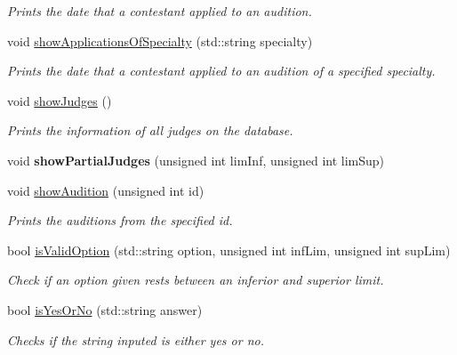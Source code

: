 \begin{DoxyCompactItemize}
\begin{DoxyCompactList}\small\item\em Prints the date that a contestant applied to an audition. \end{DoxyCompactList}\item 
\mbox{\label{class_company_m_s_a8a1ecf86813a5267a3b362c42eda0277}} 
void \hyperlink{class_company_m_s_a8a1ecf86813a5267a3b362c42eda0277}{show\+Applications\+Of\+Specialty} (std\+::string specialty)
\begin{DoxyCompactList}\small\item\em Prints the date that a contestant applied to an audition of a specified specialty. \end{DoxyCompactList}\item 
\mbox{\label{class_company_m_s_ab99e991065941d7ba095c2df82092903}} 
void \hyperlink{class_company_m_s_ab99e991065941d7ba095c2df82092903}{show\+Judges} ()
\begin{DoxyCompactList}\small\item\em Prints the information of all judges on the database. \end{DoxyCompactList}\item 
\mbox{\label{class_company_m_s_a819d7178b4b677d08b83a35c2c835152}} 
void {\bfseries show\+Partial\+Judges} (unsigned int lim\+Inf, unsigned int lim\+Sup)
\item 
void \hyperlink{class_company_m_s_a1eb164cf15206e702bc3fab2e56e75e7}{show\+Audition} (unsigned int id)
\begin{DoxyCompactList}\small\item\em Prints the auditions from the specified id. \end{DoxyCompactList}\item 
bool \hyperlink{class_company_m_s_a396a97beace49c2ba9906cc3c65c337b}{is\+Valid\+Option} (std\+::string option, unsigned int inf\+Lim, unsigned int sup\+Lim)
\begin{DoxyCompactList}\small\item\em Check if an option given rests between an inferior and superior limit. \end{DoxyCompactList}\item 
bool \hyperlink{class_company_m_s_a46d252dd9df2b48044808415d358a407}{is\+Yes\+Or\+No} (std\+::string answer)
\begin{DoxyCompactList}\small\item\em Checks if the string inputed is either yes or no. \end{DoxyCompactList}\item 

\end{DoxyCompactItemize}
